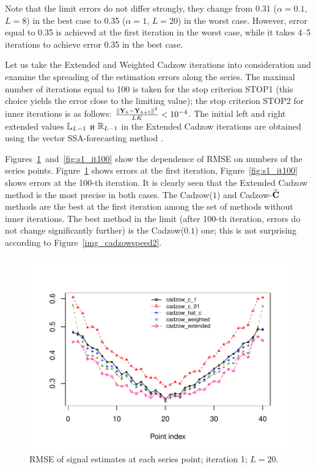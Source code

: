 \documentclass[sii]{ipart}
\begin{document}
Note that the limit errors do not differ strongly, they change from 0.31 ($\alpha=0.1$, $L=8$) in the best case to 0.35 ($\alpha=1$, $L=20$) in the worst case. However, error equal to 0.35 is achieved at the first iteration in the worst case, while it takes 4--5 iterations to achieve error 0.35 in the best case.

\smallskip
Let us take the Extended and Weighted Cadzow iterations into consideration and examine the spreading of the estimation errors along the series. The maximal number of iterations equal to 100 is taken for the stop criterion STOP1 (this choice yields the error close to the limiting value); the stop criterion STOP2 for inner iterations is as follows:
$\frac{\|\mathbf{Y}_k - \mathbf{Y}_{k+1}\|^2}{LK} < 10^{-4}$. The initial left and right extended values $\mathbb{L}_{L-1}$ и $\mathbb{R}_{L-1}$ in the Extended Cadzow iterations are obtained using the vector SSA-forecasting method \cite[chapter 2.3.1]{Golyandina.etal2001}.

Figures~\ref{fig:s1_it1}~and~\ref{fig:s1_it100} show the dependence of RMSE on numbers of the series points. Figure~\ref{fig:s1_it1} shows errors at the first iteration, Figure~\ref{fig:s1_it100} shows errors at the 100-th iteration. It is clearly seen that the Extended Cadzow method is the most precise in both cases. The Cadzow($1$) and Cadzow-$\widehat{\mathbf{C}}$ methods are the best at the first iteration among the set of methods without inner iterations. The best method in the limit (after 100-th iteration, errors do not change significantly further) is the Cadzow($0.1$) one; this is not surprising according to Figure~\ref{img_cadzowspeed2}.

\begin{figure}[!hhh]
		\includegraphics[width = \columnwidth]{s1_it1.pdf}
		\caption{RMSE of signal estimates at each series point; iteration 1; $L=20$.}
		\label{fig:s1_it1}
\end{figure}
\end{document}
